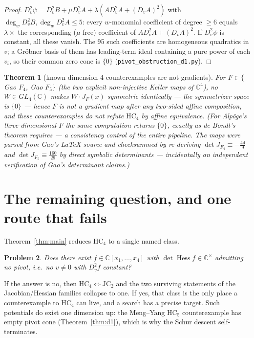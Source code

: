 \documentclass[11pt]{article}
\theoremstyle{plain}
\newtheorem{theorem}{Theorem}[section]
\newtheorem{problem}[theorem]{Problem}
\theoremstyle{definition}
\newcommand{\C}{\mathbb{C}}
\newcommand{\Hess}{\operatorname{Hess}}
\newcommand{\HC}{\mathrm{HC}}
\newcommand{\JC}{\mathrm{JC}}
\begin{document}
\begin{proof}
$D_v^2\psi=D_v^2B+\mu D_v^2A+\lambda(AD_v^2A+(D_vA)^2)$ with
$\deg_wD_v^2B,\deg_wD_v^2A\le5$: every $w$-monomial coefficient of degree
$\ge6$ equals $\lambda\times$ the corresponding ($\mu$-free) coefficient
of $A D_v^2A+(D_vA)^2$. If $D_v^2\psi$ is constant, all these vanish.
The 95 such coefficients are homogeneous quadratics in $v$; a Gr\"obner
basis of them has leading-term ideal containing a pure power of each
$v_i$, so their common zero cone is $\{0\}$
(\texttt{pivot\_obstruction\_d1.py}).
\end{proof}

\begin{theorem}[known dimension-4 counterexamples are not gradients]
\label{thm:g1}
For $F\in\{$Gao $F_4$, Gao $F_5\}$ (the two explicit non-injective Keller
maps of $\C^4$), no $W\in GL_4(\C)$ makes $W\cdot J_F(x)$ symmetric
identically --- the symmetrizer space is $\{0\}$ --- hence $F$ is not a
gradient map after any two-sided affine composition, and these
counterexamples do not refute $\HC_4$ by affine equivalence.
(For Alp\"oge's three-dimensional $F$ the same computation returns
$\{0\}$, exactly as de Bondt's theorem requires --- a consistency control
of the entire pipeline. The maps were parsed from Gao's LaTeX source and
checksummed by re-deriving $\det J_{F_4}\equiv-\tfrac{44}9$ and $\det
J_{F_5}\equiv\tfrac{160}{29}$ by direct symbolic determinants ---
incidentally an independent verification of Gao's determinant claims.)
\end{theorem}

\section{The remaining question, and one route that fails}

Theorem~\ref{thm:main} reduces $\HC_4$ to a single named class.

\begin{problem}
Does there exist $f\in\C[x_1,\dots,x_4]$ with $\det\Hess f\in\C^\times$
admitting \emph{no} pivot, i.e.\ no $v\ne0$ with $D_v^2f$ constant?
\end{problem}

If the answer is no, then $\HC_4\Leftrightarrow\JC_2$ and the two surviving
statements of the Jacobian/Hessian families collapse to one. If yes, that
class is the only place a counterexample to $\HC_4$ can live, and a search
has a precise target. Such potentials do exist one dimension up: the
Meng--Yang $\HC_5$ counterexample has empty pivot cone
(Theorem~\ref{thm:d1}), which is why the Schur descent self-terminates.
\end{document}
